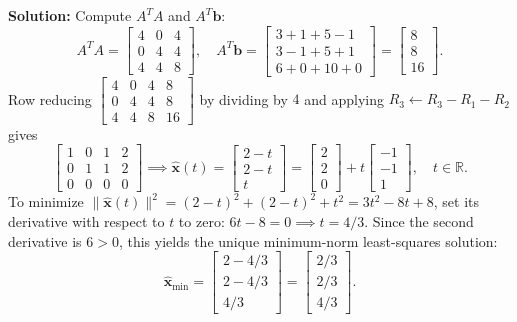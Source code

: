 \documentclass[11pt, letterpaper]{article}
\theoremstyle{definition}
\theoremstyle{remark}
\begin{document}
\textbf{Solution:} Compute $A^T A$ and $A^T \mathbf{b}$:
\[
A^T A = \begin{bmatrix} 4 & 0 & 4 \\ 0 & 4 & 4 \\ 4 & 4 & 8 \end{bmatrix}, \quad A^T \mathbf{b} = \begin{bmatrix} 3+1+5-1 \\ 3-1+5+1 \\ 6+0+10+0 \end{bmatrix} = \begin{bmatrix} 8 \\ 8 \\ 16 \end{bmatrix}.
\]
Row reducing $\left[\begin{array}{ccc|c} 4 & 0 & 4 & 8 \\ 0 & 4 & 4 & 8 \\ 4 & 4 & 8 & 16 \end{array}\right]$ by dividing by $4$ and applying $R_3 \leftarrow R_3 - R_1 - R_2$ gives
\[
\left[\begin{array}{ccc|c} 1 & 0 & 1 & 2 \\ 0 & 1 & 1 & 2 \\ 0 & 0 & 0 & 0 \end{array}\right] \implies \hat{\mathbf{x}}(t) = \begin{bmatrix} 2 - t \\ 2 - t \\ t \end{bmatrix} = \begin{bmatrix} 2 \\ 2 \\ 0 \end{bmatrix} + t \begin{bmatrix} -1 \\ -1 \\ 1 \end{bmatrix}, \quad t \in \mathbb{R}.
\]
To minimize $\|\hat{\mathbf{x}}(t)\|^2 = (2-t)^2 + (2-t)^2 + t^2 = 3t^2 - 8t + 8$, set its derivative with respect to $t$ to zero: $6t - 8 = 0 \implies t = 4/3$. Since the second derivative is $6 > 0$, this yields the unique minimum-norm least-squares solution:
\[
\hat{\mathbf{x}}_{\min} = \begin{bmatrix} 2 - 4/3 \\ 2 - 4/3 \\ 4/3 \end{bmatrix} = \begin{bmatrix} 2/3 \\ 2/3 \\ 4/3 \end{bmatrix}.
\]
\end{document}
